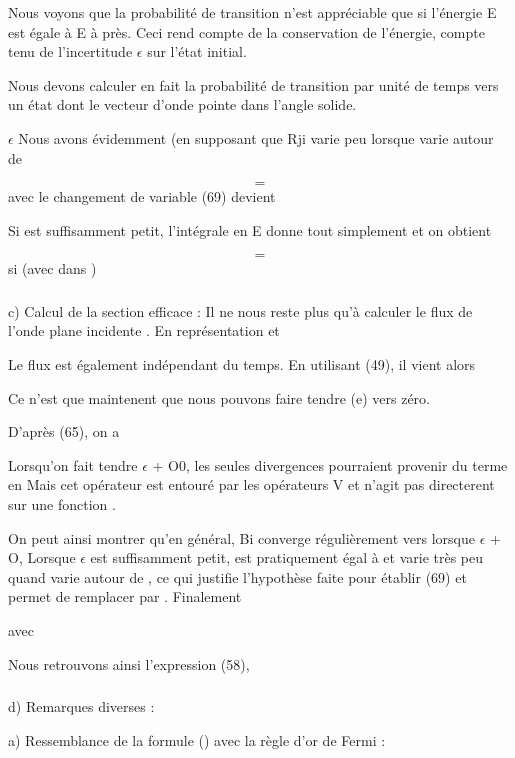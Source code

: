 {{{Nous voyons que la probabilité de transition n'est appréciable
que si l'énergie E est égale à E à  près. Ceci rend compte de la conservation
de l'énergie, compte tenu de l'incertitude $\epsilon$ sur l'état initial.

Nous devons calculer en fait la probabilité de transition par
unité de temps vers un état dont le vecteur d'onde  pointe
dans l'angle solide.


 $\epsilon$ 
Nous avons évidemment (en supposant que Rji varie peu lorsque
 varie autour de 

\[
\tag{69}=
\]
avec le changement de variable
 (69) devient

Si  est suffisamment petit, l'intégrale en E donne tout simplement 
et on obtient

\[
\tag{70}=
\]
si (avec  dans )

\subsubsection{}%
c) Calcul de la section efficace :
Il ne nous reste plus qu'à calculer le flux de l'onde plane
incidente . En représentation  et 

Le flux est également indépendant du temps. En utilisant (49), il vient
alors

Ce n'est que maintenent que nous pouvons faire tendre (e) vers zéro.

D'après (65), on a


Lorsqu'on fait tendre $\epsilon$ + O0, les seules divergences pourraient provenir
du terme en  Mais cet opérateur est entouré par les opérateurs V et n'agit pas
directerent sur une fonction .

On peut ainsi montrer qu'en général, Bi converge régulièrement vers
 lorsque $\epsilon$ + O, Lorsque $\epsilon$ est suffisamment petit,
 est pratiquement égal à  et varie très peu quand  varie autour
de , ce qui justifie l'hypothèse faite pour établir (69) et permet de
remplacer  par .
Finalement

avec 

Nous retrouvons ainsi l'expression (58),

\subsubsection{}%
d) Remarques diverses :

a) Ressemblance de la formule () avec la règle d'or de Fermi :

}}}
